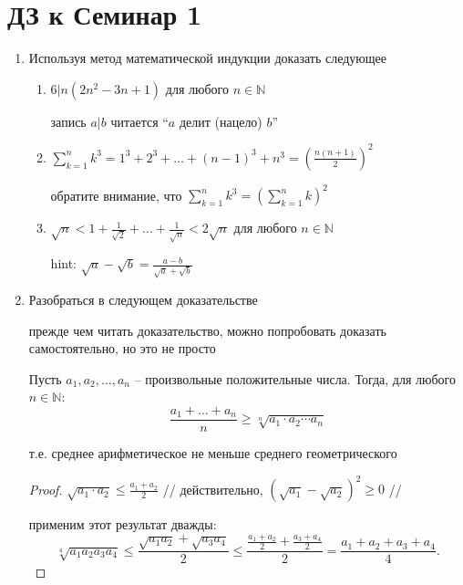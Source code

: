 \documentclass[a4paper]{article}
\begin{document}
    \section*{ДЗ к Семинар 1}

    \begin{enumerate}
    \item
        Используя метод математической индукции доказать следующее
        \begin{enumerate}[label=\alph*)]
        \item 
            $6 | n(2n^2 - 3n + 1)$ для любого $n \in \mathbb{N}$ 

            запись $a|b$ читается ``$a$ делит (нацело) $b$''
        \item
            $\sum_{k=1}^n k^3 = 1^3 + 2^3 + \dots + (n - 1)^3 + n^3 = \left( \frac{n(n + 1)}{2} \right)^2$

            обратите внимание, что $\sum_{k=1}^n k^3 = \left( \sum_{k=1}^n k \right)^2$
        \item 
            $\sqrt{n} < 1 + \frac{1}{\sqrt{2}} + \dots + \frac{1}{\sqrt{n}} < 2 \sqrt{n}$ для любого $n \in \mathbb{N}$

            hint: $\sqrt{a} - \sqrt{b} = \frac{a - b}{\sqrt{a} + \sqrt{b}}$
        \end{enumerate}

    \item 
        Разобраться в следующем доказательстве
        
        прежде чем читать доказательство, можно попробовать доказать самостоятельно, но это не просто

        Пусть $a_1, a_2, \dots, a_n$ -- произвольные положительные числа.
        Тогда, для любого $n \in \mathbb{N}$:
        \begin{equation}
            \frac{a_1 + \dots + a_n}{n} \geq \sqrt[n]{a_1 \cdot a_2 \cdots a_n}
            \tag{$\star$}
        \end{equation}

        т.е. среднее арифметическое не меньше среднего геометрического

        \begin{proof}
            $\sqrt{a_1 \cdot a_2} \leq \frac{a_1 + a_2}{2}$ // действительно, $(\sqrt{a_1} - \sqrt{a_2})^2 \geq 0$ //
            
            применим этот результат дважды:
            \[
                \sqrt[4]{a_1 a_2 a_3 a_4} 
                \leq \frac{\sqrt{a_1 a_2} + \sqrt{a_3 a_4}}{2} 
                \leq \frac{\frac{a_1 + a_2}{2} + \frac{a_3 + a_4}{2}}{2} 
                = \frac{a_1 + a_2 + a_3 + a_4}{4}.
            \]


\end{proof}
\end{enumerate}
\end{document}
